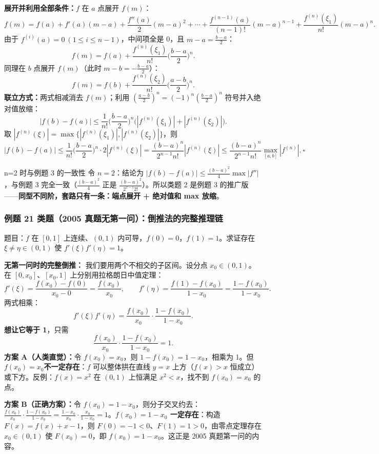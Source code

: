 \documentclass[a4paper]{article}
\begin{document}
\textbf{展开并利用全部条件：}$f$ 在 $a$ 点展开 $f(m)$：
\[
f(m)=f(a)+f'(a)(m-a)+\frac{f''(a)}{2}(m-a)^2+\cdots+\frac{f^{(n-1)}(a)}{(n-1)!}(m-a)^{n-1}+\frac{f^{(n)}(\xi_1)}{n!}(m-a)^n .
\]
由于 $f^{(i)}(a)=0\ (1\le i\le n-1)$，中间项全是 0，且 $m-a=\frac{b-a}{2}$：
\[
f(m)=f(a)+\frac{f^{(n)}(\xi_1)}{n!}\Big(\frac{b-a}{2}\Big)^n .
\]
同理在 $b$ 点展开 $f(m)$（此时 $m-b=-\frac{b-a}{2}$）：
\[
f(m)=f(b)+\frac{f^{(n)}(\xi_2)}{n!}\Big(\frac{a-b}{2}\Big)^n .
\]
\textbf{联立方式：}两式相减消去 $f(m)$；利用 $\left(\frac{a-b}{2}\right)^n=(-1)^n\left(\frac{b-a}{2}\right)^n$ 符号并入绝对值放缩：
\[
|f(b)-f(a)|\le\frac{1}{n!}\Big(\frac{b-a}{2}\Big)^n\big(|f^{(n)}(\xi_1)|+|f^{(n)}(\xi_2)|\big).
\]
取 $|f^{(n)}(\xi)|=\max\{|f^{(n)}(\xi_1)|,|f^{(n)}(\xi_2)|\}$，则
\[
|f(b)-f(a)|\le\frac{1}{n!}\Big(\frac{b-a}{2}\Big)^n\cdot 2|f^{(n)}(\xi)|=\frac{(b-a)^n}{2^{n-1}n!}|f^{(n)}(\xi)|\le\frac{(b-a)^n}{2^{n-1}n!}\max_{[a,b]}|f^{(n)}|.\ \square
\]

\begin{warningbox}{n=2 时与例题 3 的一致性}
令 $n=2$：结论为 $|f(b)-f(a)|\le\frac{(b-a)^2}{4}\max|f''|$，与例题 3 完全一致（$\frac{(b-a)^2}{4}$ 正是 $\frac{(b-a)^2}{2^{2-1}2!}$）。所以类题 2 是例题 3 的推广版——\textbf{同型不同阶，套路只有一条：端点展开 + 绝对值和 max 放缩}。
\end{warningbox}

\subsubsection{例题 21 类题（2005 真题无第一问）：倒推法的完整推理链}

题目：$f$ 在 $[0,1]$ 上连续、$(0,1)$ 内可导，$f(0)=0$，$f(1)=1$。求证存在 $\xi\neq\eta\in(0,1)$ 使 $f'(\xi)f'(\eta)=1$。

\textbf{无第一问时的完整倒推：} 我们要用两个不相交的子区间。设分点 $x_0\in(0,1)$。在 $[0,x_0]$、$[x_0,1]$ 上分别用拉格朗日中值定理：
\[
f'(\xi)=\frac{f(x_0)-f(0)}{x_0-0}=\frac{f(x_0)}{x_0},\qquad
f'(\eta)=\frac{f(1)-f(x_0)}{1-x_0}=\frac{1-f(x_0)}{1-x_0}.
\]
两式相乘：
\[
f'(\xi)f'(\eta)=\frac{f(x_0)}{x_0}\cdot\frac{1-f(x_0)}{1-x_0}.
\]
\textbf{想让它等于 1}，只需
\[
\frac{f(x_0)}{x_0}\cdot\frac{1-f(x_0)}{1-x_0}=1 .
\]
\textbf{方案 A（人类直觉）：}令 $f(x_0)=x_0$，则 $1-f(x_0)=1-x_0$，相乘为 1。但 $f(x_0)=x_0$\textbf{不一定存在}：$f$ 可以整体拱在直线 $y=x$ 上方（$f(x)>x$ 恒成立）或下方。反例：$f(x)=x^2$ 在 $(0,1)$ 上恒满足 $x^2<x$，找不到 $f(x_0)=x_0$ 的点。

\textbf{方案 B（正确方案）：}令 $f(x_0)=1-x_0$，则分子交叉约去：$\frac{f(x_0)}{x_0}\cdot\frac{1-f(x_0)}{1-x_0}=\frac{1-x_0}{x_0}\cdot\frac{x_0}{1-x_0}=1$。\textbf{$f(x_0)=1-x_0$ 一定存在}：构造 $F(x)=f(x)+x-1$，则 $F(0)=-1<0$、$F(1)=1>0$，由零点定理存在 $x_0\in(0,1)$ 使 $F(x_0)=0$，即 $f(x_0)=1-x_0$。这正是 2005 真题第一问的内容。
\end{document}
